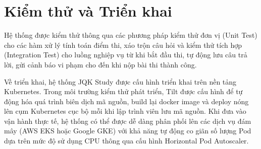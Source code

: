 \documentclass[../DoAn.tex]{subfiles}
\begin{document}
\section{Kiểm thử và Triển khai}
\label{section:4.4}

Hệ thống được kiểm thử thông qua các phương pháp kiểm thử đơn vị (Unit Test) cho các hàm xử lý tính toán điểm thi, xáo trộn câu hỏi và kiểm thử tích hợp (Integration Test) cho luồng nghiệp vụ từ khi bắt đầu thi, tự động lưu câu trả lời, gửi cảnh báo vi phạm cho đến khi nộp bài thi thành công.

Về triển khai, hệ thống JQK Study được cấu hình triển khai trên nền tảng Kubernetes. Trong môi trường kiểm thử phát triển, Tilt được cấu hình để tự động hóa quá trình biên dịch mã nguồn, build lại docker image và deploy nóng lên cụm Kubernetes cục bộ mỗi khi lập trình viên lưu mã nguồn. Khi đưa vào vận hành thực tế, hệ thống có thể được dễ dàng phân phối lên các dịch vụ đám mây (AWS EKS hoặc Google GKE) với khả năng tự động co giãn số lượng Pod dựa trên mức độ sử dụng CPU thông qua cấu hình Horizontal Pod Autoscaler.
\end{document}
